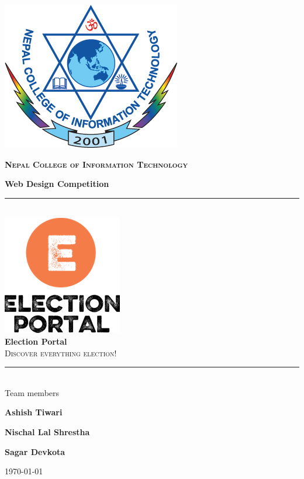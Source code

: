 \documentclass[12pt, a4paper, titlepage]{article}
\begin{document}
\begin{titlepage}
\newcommand{\HRule}{\rule{\linewidth}{0.5mm}}
\center
\begin{center}
	\includegraphics[scale=0.4]{ncit}
\end{center}
\vspace{0.75cm}
 \textsc{\Large \textbf{Nepal College of Information Technology}}\\
{\large \textbf{Web Design Competition} \par}
\vfill
\HRule \\[0.4cm]
\includegraphics[scale=0.4]{logo.png}\\[1cm] 
{ \huge \bfseries Election Portal}\\
\textsc{\large Discover everything election!}
\HRule \\[1.5cm]
\vfill
{\large Team members}\\
{\Large \textbf{Ashish Tiwari} \par}
{\Large \textbf{Nischal Lal Shrestha} \par}
{\Large \textbf{Sagar Devkota} \par}
\vfill
{\large \today}\\[1cm] 
\end{titlepage}

\end{document}
